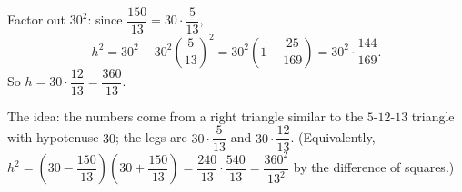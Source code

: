 Factor out $30^2$: since $\dfrac{150}{13}=30\cdot\dfrac{5}{13}$,
\[
h^2=30^2-30^2\left(\dfrac{5}{13}\right)^2=30^2\left(1-\dfrac{25}{169}\right)=30^2\cdot\dfrac{144}{169}.
\]
So $h=30\cdot\dfrac{12}{13}=\boxed{\dfrac{360}{13}}$.

The idea: the numbers come from a right triangle similar to the $5$-$12$-$13$ triangle with hypotenuse $30$; the legs are $30\cdot\dfrac{5}{13}$ and $30\cdot\dfrac{12}{13}$. (Equivalently, $h^2=\left(30-\dfrac{150}{13}\right)\left(30+\dfrac{150}{13}\right)=\dfrac{240}{13}\cdot\dfrac{540}{13}=\dfrac{360^2}{13^2}$ by the difference of squares.)
